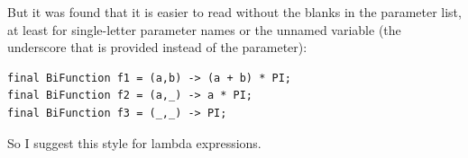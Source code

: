 But it was found that it is easier to read without the blanks in the parameter list,  at least for single-letter parameter names or the unnamed variable (the underscore that is provided instead of the parameter):
\begin{lstlisting}
final BiFunction f1 = (a,b) -> (a + b) * PI;
final BiFunction f2 = (a,_) -> a * PI;
final BiFunction f3 = (_,_) -> PI;
\end{lstlisting}

So I suggest this style for lambda expressions.

